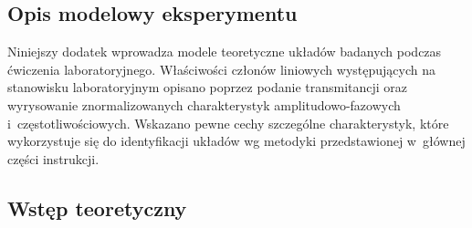 \documentclass[paper=a4,DIV=12]{lpas}
\begin{document}
\clearpage

\begin{appendices}
  \section{Opis modelowy eksperymentu}
  \label{sec:OD8DY}

  Niniejszy dodatek wprowadza modele teoretyczne układów badanych podczas
  ćwiczenia laboratoryjnego. Właściwości członów liniowych występujących na
  stanowisku laboratoryjnym opisano poprzez podanie transmitancji oraz
  wyrysowanie znormalizowanych charakterystyk amplitudowo-fazowych
  i~częstotliwościowych. Wskazano pewne cechy szczególne charakterystyk, które
  wykorzystuje się do identyfikacji układów wg metodyki przedstawionej
  w~głównej części instrukcji.

  \subsection{Wstęp teoretyczny}
  \label{sec:AIMJR}


\end{appendices}
\end{document}
